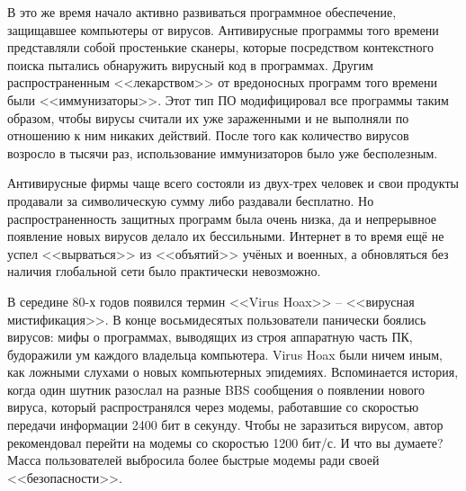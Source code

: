 В это же время начало активно развиваться программное обеспечение, защищавшее
компьютеры от вирусов. Антивирусные программы того времени представляли собой
простенькие сканеры, которые посредством контекстного поиска пытались
обнаружить вирусный код в программах. Другим распространенным <<лекарством>>
от вредоносных программ того времени были <<иммунизаторы>>. Этот тип ПО
модифицировал все программы таким образом, чтобы вирусы считали их уже
зараженными и не выполняли по отношению к ним никаких действий. После того
как количество вирусов возросло в тысячи раз, использование иммунизаторов
было уже бесполезным.

Антивирусные фирмы чаще всего состояли из двух-трех человек и свои продукты
продавали за символическую сумму либо раздавали бесплатно. Но
распространенность защитных программ была очень низка, да и непрерывное
появление новых вирусов делало их бессильными. Интернет в то время ещё не
успел <<вырваться>> из <<объятий>> учёных и военных, а обновляться без
наличия глобальной сети было практически невозможно.

В середине 80-х годов появился термин <<Virus Hoax>> – <<вирусная
мистификация>>. В конце восьмидесятых пользователи панически боялись вирусов:
мифы о программах, выводящих из строя аппаратную часть ПК, будоражили ум
каждого владельца компьютера. Virus Hoax были ничем иным, как ложными слухами
о новых компьютерных эпидемиях. Вспоминается история, когда один шутник
разослал на разные BBS сообщения о появлении нового вируса, который
распространялся через модемы, работавшие со скоростью передачи информации
2400 бит в секунду. Чтобы не заразиться вирусом, автор рекомендовал перейти
на модемы со скоростью 1200 бит/с. И что вы думаете? Масса пользователей
выбросила более быстрые модемы ради своей <<безопасности>>.

